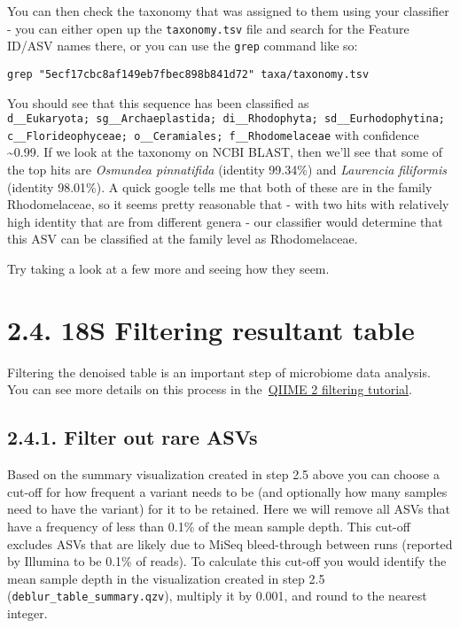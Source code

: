 \documentclass[
]{book}
\begin{document}
You can then check the taxonomy that was assigned to them using your classifier - you can either open up the \texttt{taxonomy.tsv} file and search for the Feature ID/ASV names there, or you can use the \texttt{grep} command like so:

\begin{verbatim}
grep "5ecf17cbc8af149eb7fbec898b841d72" taxa/taxonomy.tsv
\end{verbatim}

You should see that this sequence has been classified as \texttt{d\_\_Eukaryota;\ sg\_\_Archaeplastida;\ di\_\_Rhodophyta;\ sd\_\_Eurhodophytina;\ c\_\_Florideophyceae;\ o\_\_Ceramiales;\ f\_\_Rhodomelaceae} with confidence \textasciitilde0.99. If we look at the taxonomy on NCBI BLAST, then we'll see that some of the top hits are \emph{Osmundea pinnatifida} (identity 99.34\%) and \emph{Laurencia filiformis} (identity 98.01\%). A quick google tells me that both of these are in the family Rhodomelaceae, so it seems pretty reasonable that - with two hits with relatively high identity that are from different genera - our classifier would determine that this ASV can be classified at the family level as Rhodomelaceae.

Try taking a look at a few more and seeing how they seem.

\section{2.4. 18S Filtering resultant table}\label{s-filtering-resultant-table-1}

Filtering the denoised table is an important step of microbiome data analysis. You can see more details on this process in the~\href{https://docs.qiime2.org/2022.11/tutorials/filtering/}{QIIME 2 filtering tutorial}.

\subsection{2.4.1. Filter out rare ASVs}\label{filter-out-rare-asvs-1}

Based on the summary visualization created in step 2.5 above you can choose a cut-off for how frequent a variant needs to be (and optionally how many samples need to have the variant) for it to be retained. Here we will remove all ASVs that have a frequency of less than 0.1\% of the mean sample depth. This cut-off excludes ASVs that are likely due to MiSeq bleed-through between runs (reported by Illumina to be 0.1\% of reads). To calculate this cut-off you would identify the mean sample depth in the visualization created in step 2.5 (\texttt{deblur\_table\_summary.qzv}), multiply it by 0.001, and round to the nearest integer.
\end{document}
